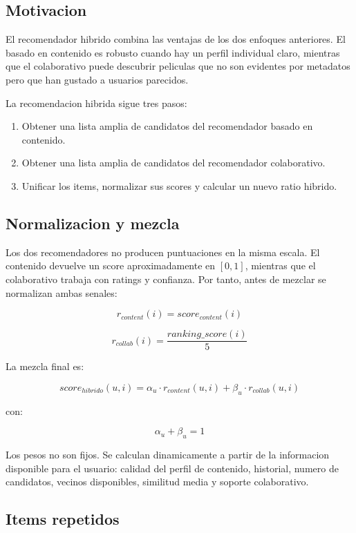 \documentclass[12pt,a4paper]{article}
\begin{document}
\subsection{Motivacion}

El recomendador hibrido combina las ventajas de los dos enfoques anteriores. El basado en contenido es robusto cuando hay un perfil individual claro, mientras que el colaborativo puede descubrir peliculas que no son evidentes por metadatos pero que han gustado a usuarios parecidos.

La recomendacion hibrida sigue tres pasos:

\begin{enumerate}[leftmargin=*]
\item Obtener una lista amplia de candidatos del recomendador basado en contenido.
\item Obtener una lista amplia de candidatos del recomendador colaborativo.
\item Unificar los items, normalizar sus scores y calcular un nuevo ratio hibrido.
\end{enumerate}

\subsection{Normalizacion y mezcla}

Los dos recomendadores no producen puntuaciones en la misma escala. El contenido devuelve un score aproximadamente en $[0,1]$, mientras que el colaborativo trabaja con ratings y confianza. Por tanto, antes de mezclar se normalizan ambas senales:

\[
r_{content}(i) = score_{content}(i)
\]

\[
r_{collab}(i) = \frac{ranking\_score(i)}{5}
\]

La mezcla final es:

\[
score_{hibrido}(u,i) =
\alpha_u \cdot r_{content}(u,i) +
\beta_u \cdot r_{collab}(u,i)
\]

con:

\[
\alpha_u + \beta_u = 1
\]

Los pesos no son fijos. Se calculan dinamicamente a partir de la informacion disponible para el usuario: calidad del perfil de contenido, historial, numero de candidatos, vecinos disponibles, similitud media y soporte colaborativo.

\subsection{Items repetidos}
\end{document}
